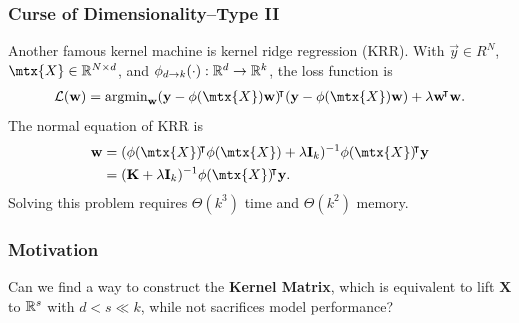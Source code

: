 \documentclass[10pt]{../formats/RU}
\begin{document}
\begin{frame}
  \frametitle{Curse of Dimensionality--Type II}
  Another famous kernel machine is kernel ridge regression (KRR). With $\vec{y}\in R^N$, $\mtx{X}\in\R^{N\times d}$, and $\phi_{d\rightarrow k}(\cdot):\mathbb{R}^d\rightarrow\mathbb{R}^k$, the loss function is
      \begin{align*}
        \mathcal{L}(\vec{w})=\argmin_{\vec{w}}(\vec{y}-\phi(\mtx{X})\vec{w})\trn(\vec{y}-\phi(\mtx{X})\vec{w}) + \lambda\vec{w}\trn\vec{w}.
      \end{align*}
    The normal equation of KRR is
    \begin{align*}
      \vec{w} &= (\phi(\mtx{X})\trn\phi(\mtx{X})+\lambda\mathbf{I}_k)^{-1}\phi(\mtx{X})\trn\vec{y} \\
      &= (\mathbf{K}+\lambda\mathbf{I}_k)^{-1}\phi(\mtx{X})\trn\vec{y}.
    \end{align*}
    Solving this problem requires $\Theta(k^3)$ time and $\Theta(k^2)$ memory.
\end{frame}
\begin{frame}
  \frametitle{Motivation}
  Can we find a way to construct the \textbf{Kernel Matrix}, which is equivalent to lift $\mathbf{X}$ to $\mathbb{R}^s$ with $d < s\ll k$, while not sacrifices model performance?
\end{frame}
\end{document}
